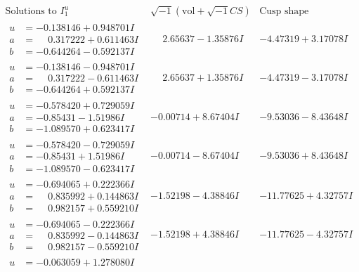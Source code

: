 \documentclass[1p]{elsarticle_modified}
\theoremstyle{definition}
\newcommand{\I}{\sqrt{-1}}
\begin{document}
$$\begin{array}{c|c|c}  
\text{Solutions to }I^u_{1}& \I (\text{vol} + \sqrt{-1}CS) & \text{Cusp shape}\\
 \hline 
\begin{aligned}
u &= -0.138146 + 0.948701 I \\
a &= \phantom{-}0.317222 + 0.611463 I \\
b &= -0.644264 - 0.592137 I\end{aligned}
 & \phantom{-}2.65637 - 1.35876 I & -4.47319 + 3.17078 I \\ \hline\begin{aligned}
u &= -0.138146 - 0.948701 I \\
a &= \phantom{-}0.317222 - 0.611463 I \\
b &= -0.644264 + 0.592137 I\end{aligned}
 & \phantom{-}2.65637 + 1.35876 I & -4.47319 - 3.17078 I \\ \hline\begin{aligned}
u &= -0.578420 + 0.729059 I \\
a &= -0.85431 - 1.51986 I \\
b &= -1.089570 + 0.623417 I\end{aligned}
 & -0.00714 + 8.67404 I & -9.53036 - 8.43648 I \\ \hline\begin{aligned}
u &= -0.578420 - 0.729059 I \\
a &= -0.85431 + 1.51986 I \\
b &= -1.089570 - 0.623417 I\end{aligned}
 & -0.00714 - 8.67404 I & -9.53036 + 8.43648 I \\ \hline\begin{aligned}
u &= -0.694065 + 0.222366 I \\
a &= \phantom{-}0.835992 + 0.144863 I \\
b &= \phantom{-}0.982157 + 0.559210 I\end{aligned}
 & -1.52198 - 4.38846 I & -11.77625 + 4.32757 I \\ \hline\begin{aligned}
u &= -0.694065 - 0.222366 I \\
a &= \phantom{-}0.835992 - 0.144863 I \\
b &= \phantom{-}0.982157 - 0.559210 I\end{aligned}
 & -1.52198 + 4.38846 I & -11.77625 - 4.32757 I \\ \hline\begin{aligned}
u &= -0.063059 + 1.278080 I \\

\end{aligned}
\end{array}$$
\end{document}

